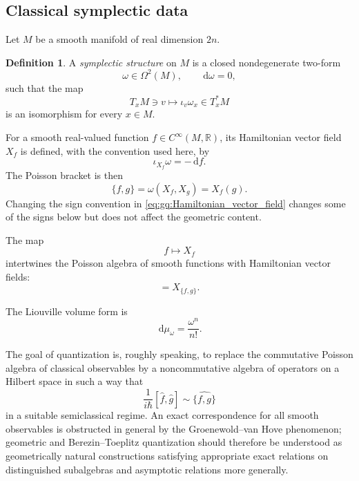 \documentclass[a4paper,11pt]{article}
\theoremstyle{definition}
\newtheorem{definition}{Definition}[section]
\newcommand{\dd}{\,\mathrm{d}}
\begin{document}
\subsection{Classical symplectic data}
\label{app:gq:symplectic}

Let $M$ be a smooth manifold of real dimension $2n$.

\begin{definition}
A \emph{symplectic structure} on $M$ is a closed nondegenerate two-form
\begin{equation}
    \omega\in\Omega^2(M),
    \qquad
    \dd\omega=0,
\end{equation}
such that the map
\begin{equation}
    T_xM\ni v\longmapsto \iota_v\omega_x\in T_x^*M
\end{equation}
is an isomorphism for every $x\in M$.
\end{definition}

For a smooth real-valued function $f\in C^\infty(M,\mathbb R)$, its
Hamiltonian vector field $X_f$ is defined, with the convention used here, by
\begin{equation}
    \iota_{X_f}\omega=-\dd f.
    \label{eq:gq:Hamiltonian_vector_field}
\end{equation}
The Poisson bracket is then
\begin{equation}
    \{f,g\}
    =
    \omega(X_f,X_g)
    =
    X_f(g).
\end{equation}
Changing the sign convention in
\eqref{eq:gq:Hamiltonian_vector_field} changes some of the signs below but
does not affect the geometric content.

The map
\begin{equation}
    f\longmapsto X_f
\end{equation}
intertwines the Poisson algebra of smooth functions with Hamiltonian vector
fields:
\begin{equation}
    [X_f,X_g]=X_{\{f,g\}}.
\end{equation}

The Liouville volume form is
\begin{equation}
    \dd\mu_\omega
    =
    \frac{\omega^n}{n!}.
\end{equation}

The goal of quantization is, roughly speaking, to replace the commutative
Poisson algebra of classical observables by a noncommutative algebra of
operators on a Hilbert space in such a way that
\begin{equation}
    \frac{1}{i\hbar}
    [\widehat f,\widehat g]
    \sim
    \widehat{\{f,g\}}
\end{equation}
in a suitable semiclassical regime.  An exact correspondence for all smooth
observables is obstructed in general by the Groenewold--van Hove phenomenon;
geometric and Berezin--Toeplitz quantization should therefore be understood
as geometrically natural constructions satisfying appropriate exact
relations on distinguished subalgebras and asymptotic relations more
generally.
\end{document}
